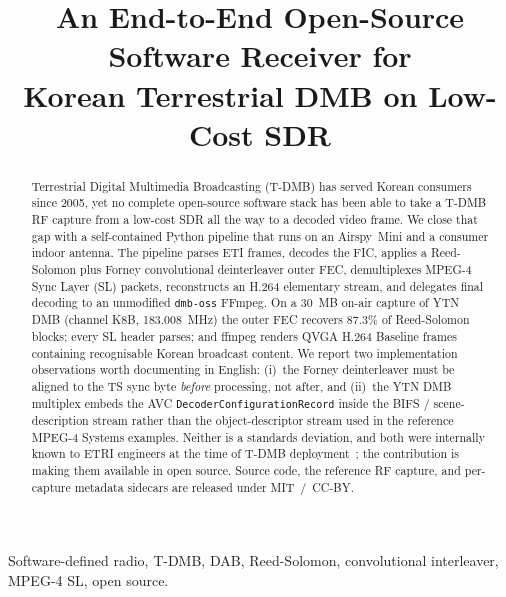 \documentclass[conference,letterpaper,10pt]{IEEEtran}
\begin{document}
\title{An End-to-End Open-Source Software Receiver for\\
       Korean Terrestrial DMB on Low-Cost SDR}

\author{%
}

\maketitle

\begin{abstract}
Terrestrial Digital Multimedia Broadcasting (T-DMB) has served
Korean consumers since 2005, yet no complete open-source software
stack has been able to take a T-DMB RF capture from a low-cost
SDR all the way to a decoded video frame.  We close that gap with
a self-contained Python pipeline that runs on an Airspy~Mini and a
consumer indoor antenna.  The pipeline parses ETI frames, decodes
the FIC, applies a Reed-Solomon plus Forney convolutional
deinterleaver outer FEC, demultiplexes MPEG-4 Sync Layer (SL)
packets, reconstructs an H.264 elementary stream, and delegates
final decoding to an unmodified \texttt{dmb-oss} FFmpeg.  On a
30~MB on-air capture of YTN DMB (channel K8B, 183.008~MHz) the
outer FEC recovers 87.3\% of Reed-Solomon blocks; every SL header
parses; and ffmpeg renders QVGA H.264 Baseline frames containing
recognisable Korean broadcast content.  We report two
implementation observations worth documenting in English: (i)~the
Forney deinterleaver must be aligned to the TS sync byte
\emph{before} processing, not after, and (ii)~the YTN DMB
multiplex embeds the AVC \texttt{DecoderConfigurationRecord}
inside the BIFS / scene-description stream rather than the
object-descriptor stream used in the reference MPEG-4 Systems
examples.  Neither is a standards deviation, and both were
internally known to ETRI engineers at the time of T-DMB
deployment~\cite{lee2004m4smux}; the contribution is making them
available in open source.  Source code, the reference RF capture,
and per-capture metadata sidecars are released under MIT~/~CC-BY.
\end{abstract}

\begin{IEEEkeywords}
Software-defined radio, T-DMB, DAB, Reed-Solomon,
convolutional interleaver, MPEG-4 SL, open source.
\end{IEEEkeywords}
\end{document}
